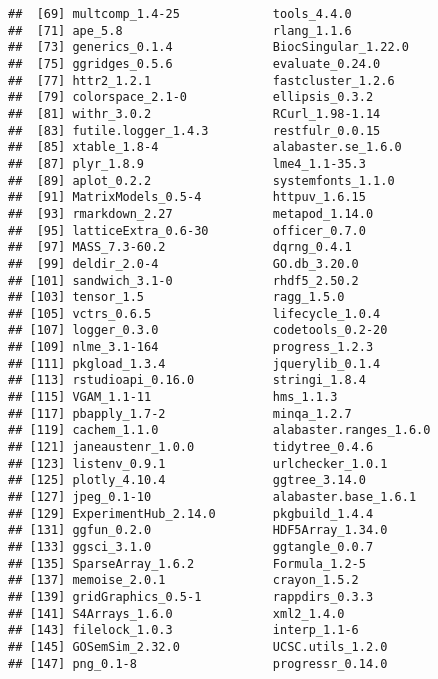\documentclass[
  11pt,
  a4paper,
]{article}
\begin{document}
\begin{verbatim}
##  [69] multcomp_1.4-25             tools_4.4.0                
##  [71] ape_5.8                     rlang_1.1.6                
##  [73] generics_0.1.4              BiocSingular_1.22.0        
##  [75] ggridges_0.5.6              evaluate_0.24.0            
##  [77] httr2_1.2.1                 fastcluster_1.2.6          
##  [79] colorspace_2.1-0            ellipsis_0.3.2             
##  [81] withr_3.0.2                 RCurl_1.98-1.14            
##  [83] futile.logger_1.4.3         restfulr_0.0.15            
##  [85] xtable_1.8-4                alabaster.se_1.6.0         
##  [87] plyr_1.8.9                  lme4_1.1-35.3              
##  [89] aplot_0.2.2                 systemfonts_1.1.0          
##  [91] MatrixModels_0.5-4          httpuv_1.6.15              
##  [93] rmarkdown_2.27              metapod_1.14.0             
##  [95] latticeExtra_0.6-30         officer_0.7.0              
##  [97] MASS_7.3-60.2               dqrng_0.4.1                
##  [99] deldir_2.0-4                GO.db_3.20.0               
## [101] sandwich_3.1-0              rhdf5_2.50.2               
## [103] tensor_1.5                  ragg_1.5.0                 
## [105] vctrs_0.6.5                 lifecycle_1.0.4            
## [107] logger_0.3.0                codetools_0.2-20           
## [109] nlme_3.1-164                progress_1.2.3             
## [111] pkgload_1.3.4               jquerylib_0.1.4            
## [113] rstudioapi_0.16.0           stringi_1.8.4              
## [115] VGAM_1.1-11                 hms_1.1.3                  
## [117] pbapply_1.7-2               minqa_1.2.7                
## [119] cachem_1.1.0                alabaster.ranges_1.6.0     
## [121] janeaustenr_1.0.0           tidytree_0.4.6             
## [123] listenv_0.9.1               urlchecker_1.0.1           
## [125] plotly_4.10.4               ggtree_3.14.0              
## [127] jpeg_0.1-10                 alabaster.base_1.6.1       
## [129] ExperimentHub_2.14.0        pkgbuild_1.4.4             
## [131] ggfun_0.2.0                 HDF5Array_1.34.0           
## [133] ggsci_3.1.0                 ggtangle_0.0.7             
## [135] SparseArray_1.6.2           Formula_1.2-5              
## [137] memoise_2.0.1               crayon_1.5.2               
## [139] gridGraphics_0.5-1          rappdirs_0.3.3             
## [141] S4Arrays_1.6.0              xml2_1.4.0                 
## [143] filelock_1.0.3              interp_1.1-6               
## [145] GOSemSim_2.32.0             UCSC.utils_1.2.0           
## [147] png_0.1-8                   progressr_0.14.0           

\end{verbatim}
\end{document}
